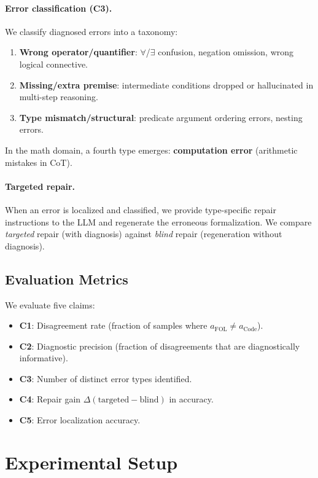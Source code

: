 \documentclass[11pt,a4paper]{article}
\begin{document}
\paragraph{Error classification (C3).} We classify diagnosed errors into a taxonomy:
\begin{enumerate}
\item \textbf{Wrong operator/quantifier}: $\forall$/$\exists$ confusion, negation omission, wrong logical connective.
\item \textbf{Missing/extra premise}: intermediate conditions dropped or hallucinated in multi-step reasoning.
\item \textbf{Type mismatch/structural}: predicate argument ordering errors, nesting errors.
\end{enumerate}
In the math domain, a fourth type emerges: \textbf{computation error} (arithmetic mistakes in CoT).

\paragraph{Targeted repair.} When an error is localized and classified, we provide type-specific repair instructions to the LLM and regenerate the erroneous formalization. We compare \emph{targeted} repair (with diagnosis) against \emph{blind} repair (regeneration without diagnosis).

\subsection{Evaluation Metrics}
We evaluate five claims:
\begin{itemize}
\item \textbf{C1}: Disagreement rate (fraction of samples where $a_{\text{FOL}} \neq a_{\text{Code}}$).
\item \textbf{C2}: Diagnostic precision (fraction of disagreements that are diagnostically informative).
\item \textbf{C3}: Number of distinct error types identified.
\item \textbf{C4}: Repair gain $\Delta(\text{targeted} - \text{blind})$ in accuracy.
\item \textbf{C5}: Error localization accuracy.
\end{itemize}

\section{Experimental Setup}
\label{sec:setup}
\end{document}
